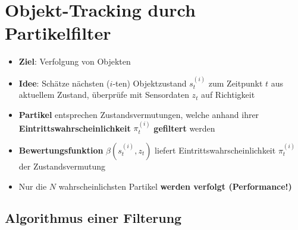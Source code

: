\section{Objekt-Tracking durch Partikelfilter}%
\label{track:sec:objekt_tracking_durch_partikelfilter}

\begin{itemize}
	\item \textbf{Ziel}: Verfolgung von Objekten
	\item \textbf{Idee}: Schätze nächsten ($i$-ten) Objektzustand $s_t^{(i)}$ zum Zeitpunkt $t$ aus aktuellem Zustand, überprüfe mit Sensordaten $z_t$ auf Richtigkeit
	\item \textbf{Partikel} entsprechen Zustandsvermutungen, welche anhand ihrer \textbf{Eintrittswahrscheinlichkeit} $\pi_t^{(i)}$ \textbf{gefiltert} werden
	\item \textbf{Bewertungsfunktion} $\beta(s_t^{(i)}, z_t)$ liefert Eintrittswahrscheinlichkeit $\pi_t^{(i)}$ der Zustandsvermutung
	\item Nur die $N$ wahrscheinlichsten Partikel \textbf{werden verfolgt (Performance!)}
\end{itemize}

\subsection{Algorithmus einer Filterung}%
\label{track:sub:algorithmus_einer_filterung}

